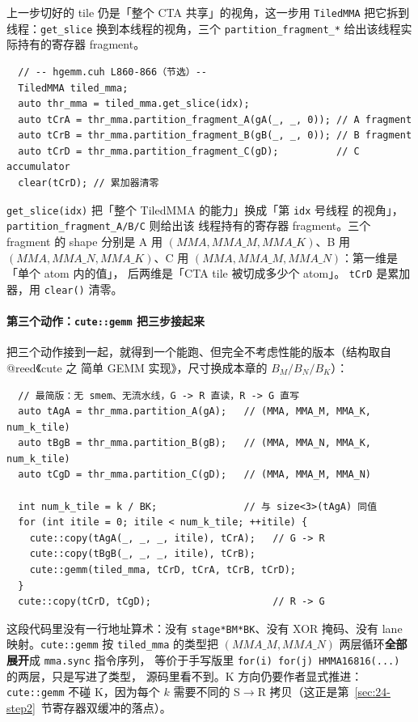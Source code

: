 上一步切好的 tile 仍是「整个 CTA 共享」的视角，这一步用 \texttt{TiledMMA}
把它拆到线程：\texttt{get\_slice} 换到本线程的视角，三个
\texttt{partition\_fragment\_*} 给出该线程实际持有的寄存器 fragment。

\begin{lstlisting}
  // -- hgemm.cuh L860-866（节选）--
  TiledMMA tiled_mma;
  auto thr_mma = tiled_mma.get_slice(idx);
  auto tCrA = thr_mma.partition_fragment_A(gA(_, _, 0)); // A fragment
  auto tCrB = thr_mma.partition_fragment_B(gB(_, _, 0)); // B fragment
  auto tCrD = thr_mma.partition_fragment_C(gD);          // C accumulator
  clear(tCrD); // 累加器清零
\end{lstlisting}

\texttt{get\_\allowbreak{}slice\allowbreak{}(idx)} 把「整个 TiledMMA 的能力」换成「第 \texttt{idx} 号线程
的视角」，\texttt{partition\_\allowbreak{}fragment\_\allowbreak{}}\allowbreak\texttt{A/B/C} 则给出该
线程持有的寄存器 fragment。三个 fragment 的 shape 分别是 A 用
$(MMA, MMA\_M, MMA\_K)$、B 用 $(MMA, MMA\_N, MMA\_K)$、C 用
$(MMA, MMA\_M, MMA\_N)$：第一维是「单个 atom 内的值」，
后两维是「CTA tile 被切成多少个 atom」。
\texttt{tCrD} 是累加器，用 \texttt{clear()} 清零。

\paragraph{第三个动作：\texttt{cute::gemm} 把三步接起来}

把三个动作接到一起，就得到一个能跑、但完全不考虑性能的版本（结构取自
@reed《cute 之 简单 GEMM 实现》，尺寸换成本章的 $B_M/B_N/B_K$）：

\begin{lstlisting}
  // 最简版：无 smem、无流水线，G -> R 直读，R -> G 直写
  auto tAgA = thr_mma.partition_A(gA);   // (MMA, MMA_M, MMA_K, num_k_tile)
  auto tBgB = thr_mma.partition_B(gB);   // (MMA, MMA_N, MMA_K, num_k_tile)
  auto tCgD = thr_mma.partition_C(gD);   // (MMA, MMA_M, MMA_N)

  int num_k_tile = k / BK;               // 与 size<3>(tAgA) 同值
  for (int itile = 0; itile < num_k_tile; ++itile) {
    cute::copy(tAgA(_, _, _, itile), tCrA);   // G -> R
    cute::copy(tBgB(_, _, _, itile), tCrB);
    cute::gemm(tiled_mma, tCrD, tCrA, tCrB, tCrD);
  }
  cute::copy(tCrD, tCgD);                     // R -> G
\end{lstlisting}

这段代码里没有一行地址算术：没有 \texttt{stage*BM*BK}、没有 XOR 掩码、没有
lane 映射。\texttt{cute::gemm} 按 \texttt{tiled\_mma} 的类型把
$(MMA\_M, MMA\_N)$ 两层循环\textbf{全部展开}成 \texttt{mma.sync} 指令序列，
等价于手写版里 \texttt{for\allowbreak{}(i)\ for\allowbreak{}(j)\ HMMA16816\allowbreak{}(.\allowbreak{}.\allowbreak{}.\allowbreak{})} 的两层，只是写进了类型，
源码里看不到。K 方向仍要作者显式推进：\texttt{cute::gemm} 不碰 K，因为每个
$k$ 需要不同的 S$\to$R 拷贝（这正是第~\ref{sec:24-step2}~节寄存器双缓冲的落点）。

